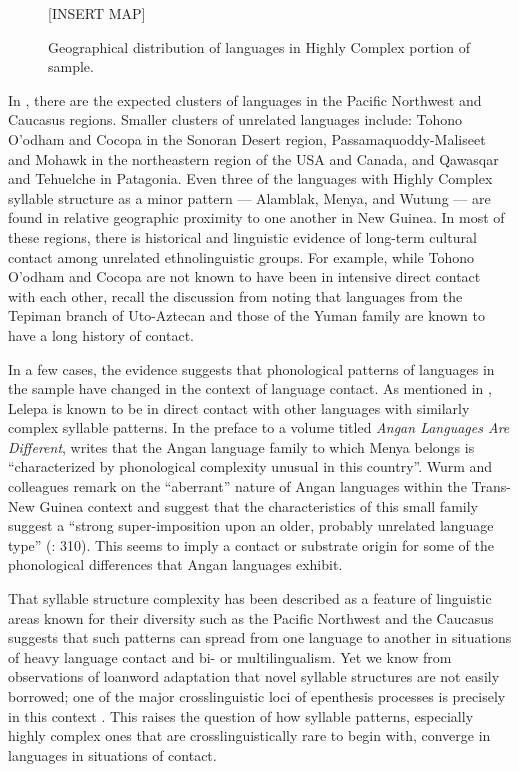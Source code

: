   
\begin{figure}
{}[INSERT MAP]

\caption{\label{fig:8.1} Geographical distribution of languages in Highly Complex portion of sample.}
\end{figure}

  In , there are the expected clusters of languages in the Pacific Northwest and Caucasus regions. Smaller clusters of unrelated languages include: Tohono O’odham and Cocopa in the Sonoran Desert region, Passamaquoddy-Maliseet and Mohawk in the northeastern region of the USA and Canada, and Qawasqar and Tehuelche in Patagonia. Even three of the languages with Highly Complex syllable structure as a minor pattern — Alamblak, Menya, and Wutung — are found in relative geographic proximity to one another in New Guinea. In most of these regions, there is historical and linguistic evidence of long-term cultural contact among unrelated ethnolinguistic groups. For example, while Tohono O’odham and Cocopa are not known to have been in intensive direct contact with each other, recall the discussion from  noting that languages from the Tepiman branch of Uto-Aztecan and those of the Yuman family are known to have a long history of contact. 

  In a few cases, the evidence suggests that phonological patterns of languages in the sample have changed in the context of language contact. As mentioned in , Lelepa is known to be in direct contact with other languages with similarly complex syllable patterns. In the preface to a volume titled \textit{Angan Languages Are Different}, \citet[4]{Healey1981} writes that the Angan language family to which Menya belongs is “characterized by phonological complexity unusual in this country”. Wurm and colleagues remark on the “aberrant” nature of Angan languages within the Trans-New Guinea context and suggest that the characteristics of this small family suggest a “strong super-imposition upon an older, probably unrelated language type” (\citeyear{WurmEtAl1977}: 310). This seems to imply a contact or substrate origin for some of the phonological differences that Angan languages exhibit.

  That syllable structure complexity has been described as a feature of linguistic areas known for their diversity such as the Pacific Northwest and the Caucasus suggests that such patterns can spread from one language to another in situations of heavy language contact and bi- or multilingualism. Yet we know from observations of loanword adaptation that novel syllable structures are not easily borrowed; one of the major crosslinguistic loci of epenthesis processes is precisely in this context \citep{Hall2011}. This raises the question of how syllable patterns, especially highly complex ones that are crosslinguistically rare to begin with, converge in languages in situations of contact.

